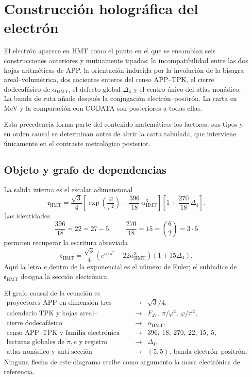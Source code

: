 \chapter{Construcción holográfica del electrón}
\label{chap:biografia-electron-rev6}

El electrón aparece en HMT como el punto en el que se ensamblan seis
construcciones anteriores y mutuamente tipadas: la incompatibilidad entre
las dos hojas aritméticas de APP, la orientación inducida por la involución
de la bisagra areal--volumétrica, dos cocientes enteros del censo APP--TPK,
el cierre
dodecafásico de \(\alpha_{\mathrm{HMT}}\), el defecto global
\(\Delta_4\) y el centro único del atlas nonádico. La banda de ruta añade
después la conjugación electrón--positrón. La carta en MeV y la comparación
con CODATA son posteriores a todas ellas.

Esta precedencia forma parte del contenido matemático: los factores, sus
tipos y su orden causal se determinan antes de abrir la carta tabulada, que
interviene únicamente en el contraste metrológico posterior.

\section{Objeto y grafo de dependencias}

La salida interna es el escalar adimensional
\begin{equation}
 \label{eq:electron-holografico-rev6}
 \boxed{
 \mathfrak e_{\mathrm{HMT}}
 =
 \frac{\sqrt3}{4}
 \left[
 \exp\!\left(\frac{\varphi}{\pi^2}\right)
 -\frac{396}{18}\,\alpha_{\mathrm{HMT}}^3
 \right]
 \left[
 1+\frac{270}{18}\,\Delta_4
 \right].}
\end{equation}
Las identidades
\[
 \frac{396}{18}=22=27-5,
 \qquad
 \frac{270}{18}=15=\binom62=3\cdot5
 \]
permiten recuperar la escritura abreviada
\[
 \mathfrak e_{\mathrm{HMT}}
 =
 \frac{\sqrt3}{4}
 \left(e^{\varphi/\pi^2}-22\alpha_{\mathrm{HMT}}^3\right)
 (1+15\Delta_4).
\]
Aquí la letra \(e\) dentro de la exponencial es el número de Euler; el
subíndice de \(\mathfrak e_{\mathrm{HMT}}\) designa la sección electrónica.

El grafo causal de la ecuación es
\[
\begin{array}{ccl}
\text{proyectores APP en dimensión tres}
&\longrightarrow& \sqrt3/4,\\[2mm]
\text{calendario TPK y hojas areal--volumétrica}
&\longrightarrow&
F_{\mathrm{av}},\ \pi/\varphi^2,\
\varphi/\pi^2,\\[2mm]
\text{cierre dodecafásico}
&\longrightarrow&\alpha_{\mathrm{HMT}},\\[2mm]
\text{censo APP--TPK y familia electrónica}
&\longrightarrow&396,\ 18,\ 270,\ 22,\ 15,\ 5,\\[2mm]
\text{lecturas globales de }\pi,e\text{ y registro}
&\longrightarrow&\Delta_4,\\[2mm]
\text{atlas nonádico y anti-sección}
&\longrightarrow&(5,5),\
\text{banda electrón--positrón}.
\end{array}
\]
Ninguna flecha de este diagrama recibe como argumento la masa electrónica
de referencia.

